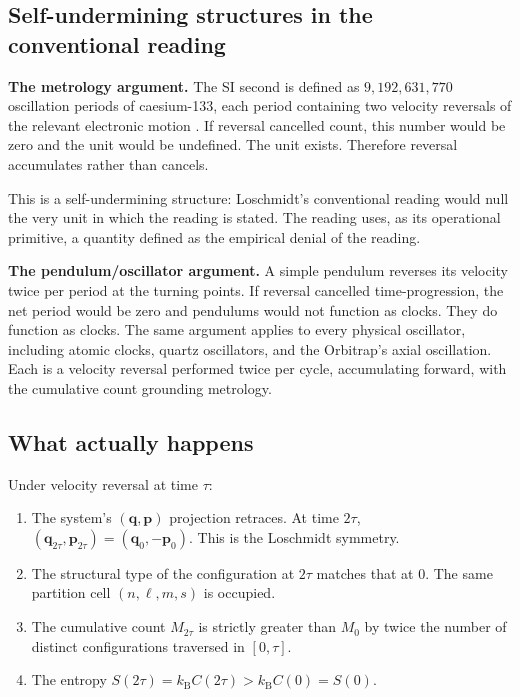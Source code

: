 \documentclass[twocolumn,10pt,a4paper]{article}
\theoremstyle{thmstyle}
\theoremstyle{definition}
\theoremstyle{remark}
\newcommand{\kB}{k_{\mathrm{B}}}
\begin{document}
\subsection{Self-undermining structures in the conventional reading}

\textbf{The metrology argument.} The SI second is defined as
$9{,}192{,}631{,}770$ oscillation periods of caesium-133, each
period containing two velocity reversals of the relevant electronic
motion \citep{si2019}. If reversal cancelled count, this number would
be zero and the unit would be undefined. The unit exists. Therefore
reversal accumulates rather than cancels.

This is a self-undermining structure: Loschmidt's conventional
reading would null the very unit in which the reading is stated. The
reading uses, as its operational primitive, a quantity defined as the
empirical denial of the reading.

\textbf{The pendulum/oscillator argument.} A simple pendulum reverses
its velocity twice per period at the turning points. If reversal
cancelled time-progression, the net period would be zero and pendulums
would not function as clocks. They do function as clocks. The same
argument applies to every physical oscillator, including atomic
clocks, quartz oscillators, and the Orbitrap's axial oscillation.
Each is a velocity reversal performed twice per cycle, accumulating
forward, with the cumulative count grounding metrology.

\subsection{What actually happens}

Under velocity reversal at time $\tau$:

\begin{enumerate}[nosep,leftmargin=*]
\item The system's $(\mathbf{q},\mathbf{p})$ projection retraces. At
time $2\tau$, $(\mathbf{q}_{2\tau},\mathbf{p}_{2\tau})
=(\mathbf{q}_{0},-\mathbf{p}_{0})$. This is the Loschmidt symmetry.
\item The structural type of the configuration at $2\tau$ matches
that at $0$. The same partition cell $(n,\ell,m,s)$ is occupied.
\item The cumulative count $M_{2\tau}$ is strictly greater than $M_{0}$
by twice the number of distinct configurations traversed in $[0,\tau]$.
\item The entropy $S(2\tau)=\kB C(2\tau)>\kB C(0)=S(0)$.
\end{enumerate}
\end{document}
